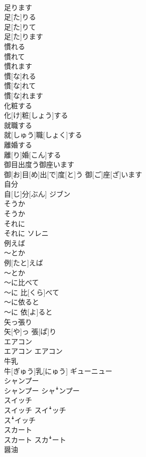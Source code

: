 \documentclass[8pt]{extreport}
\begin{document}
\begin{CJK}{UTF8}{min}
\\	足ります	
\\	足[た]りる 
\\	足[た]りて 
\\	足[た]ります	
\\	慣れる 
\\	慣れて 
\\	慣れます	
\\	慣[な]れる 
\\	慣[な]れて 
\\	慣[な]れます	
\\	化粧する	
\\	化[け]粧[しょう]する	
\\	就職する	
\\	就[しゅう]職[しょく]する	
\\	離婚する	
\\	離[り]婚[こん]する	
\\	御目出度う御座います	
\\	御[お]目[め]出[で]度[と]う 御[ご]座[ざ]います	
\\	自分	
\\	自[じ]分[ぶん]	ジブン
\\	そうか	
\\	そうか	
\\	それに	
\\	それに	ソレニ
\\	例えば 
\\	〜とか	
\\	例[たと]えば 
\\	〜とか	
\\	〜に比べて	
\\	〜に 比[くら]べて	
\\	〜に依ると	
\\	〜に 依[よ]ると	
\\	矢っ張り	
\\	矢[や]っ 張[ぱ]り	
\\	エアコン	
\\	エアコン	エアコン
\\	牛乳	
\\	牛[ぎゅう]乳[にゅう]	ギューニュー
\\	シャンプー	
\\	シャンプー	シャꜜンプー
\\	スイッチ	
\\	スイッチ	スイꜜッチ 
\\	スꜜイッチ
\\	スカート	
\\	スカート	スカꜜート
\\	醤油	

\end{CJK}
\end{document}
